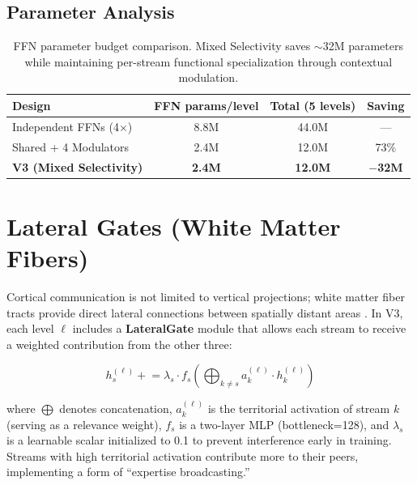 \documentclass[11pt,a4paper]{article}
\begin{document}
\subsection{Parameter Analysis}

\begin{table}[h]
\centering
\small
\begin{tabular}{lccc}
\toprule
\textbf{Design} & \textbf{FFN params/level} & \textbf{Total (5 levels)} & \textbf{Saving}\\
\midrule
Independent FFNs (4$\times$) & 8.8M & 44.0M & --- \\
Shared + 4 Modulators        & 2.4M & 12.0M & 73\% \\
\midrule
\textbf{V3 (Mixed Selectivity)} & \textbf{2.4M} & \textbf{12.0M} & \textbf{$-$32M} \\
\bottomrule
\end{tabular}
\caption{FFN parameter budget comparison.  Mixed Selectivity saves $\sim$32M
parameters while maintaining per-stream functional specialization through
contextual modulation.}
\label{tab:ffn_budget}
\end{table}

\section{Lateral Gates (White Matter Fibers)}
\label{sec:lateral}

Cortical communication is not limited to vertical projections; white matter
fiber tracts provide direct lateral connections between spatially distant areas
\citep{catani2008diffusion}.  In V3, each level $\ell$ includes a
\textbf{LateralGate} module that allows each stream to receive a weighted
contribution from the other three:

\begin{equation}
    h_s^{(\ell)} \mathrel{+}= \lambda_s \cdot f_s\!\left(
        \bigoplus_{k \neq s} a_k^{(\ell)} \cdot h_k^{(\ell)}
    \right)
    \label{eq:lateral}
\end{equation}

where $\bigoplus$ denotes concatenation, $a_k^{(\ell)}$ is the territorial
activation of stream $k$ (serving as a relevance weight), $f_s$ is a two-layer
MLP (bottleneck=128), and $\lambda_s$ is a learnable scalar initialized to
0.1 to prevent interference early in training.  Streams with high territorial
activation contribute more to their peers, implementing a form of
``expertise broadcasting.''
\end{document}
